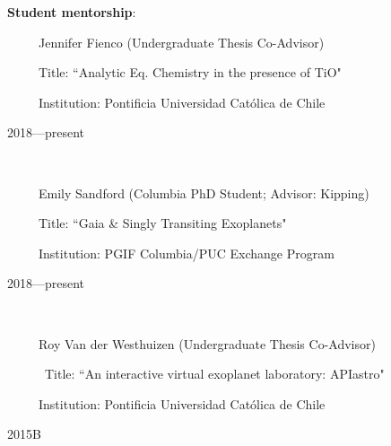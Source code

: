 \documentclass[11pt, a4paper]{article} %
\begin{document}
\begin{flushleft}%
  \setlength{\leftskip}{0.2cm}%
\textbf{Student mentorship}:
\end{flushleft}
\begin{minipage}[t]{0.6\textwidth}
\ \ \ \ \ Jennifer Fienco (Undergraduate Thesis Co-Advisor)

\ \ \ \ \ Title:  ``Analytic Eq. Chemistry in the presence of TiO"

\ \ \ \ \ Institution:  Pontificia Universidad Cat\'olica de Chile
\end{minipage}
\begin{minipage}[t]{0.4\textwidth}
\hfill 2018---present
\end{minipage}\\
\vspace{0.2 cm}

\begin{minipage}[t]{0.6\textwidth}
\ \ \ \ \ Emily Sandford (Columbia PhD Student; Advisor: Kipping)

\ \ \ \ \ Title:  ``Gaia \& Singly Transiting Exoplanets"

\ \ \ \ \ Institution:  PGIF Columbia/PUC Exchange Program
\end{minipage}
\begin{minipage}[t]{0.4\textwidth}
\hfill 2018---present
\end{minipage}\\
\vspace{0.2 cm}


\begin{minipage}[t]{0.6\textwidth}
\ \ \ \ \ Roy Van der Westhuizen (Undergraduate Thesis Co-Advisor)

\ \ \ \ \ \ Title: ``An interactive virtual exoplanet laboratory: APIastro"

\ \ \ \ \ Institution:  Pontificia Universidad Cat\'olica de Chile
\end{minipage}
\begin{minipage}[t]{0.4\textwidth}
\hfill 2015B
\end{minipage}
\end{document}
